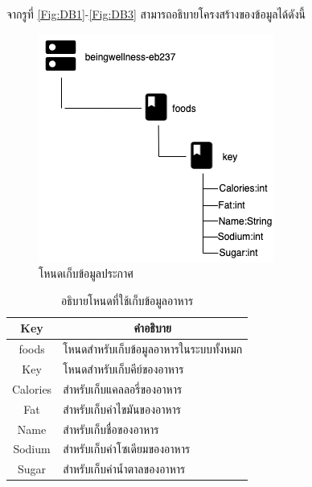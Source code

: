 \newpage
จากรูที่ \ref{Fig:DB1}-\ref{Fig:DB3} สามารถอธิบายโครงสร้างของข้อมูลได้ดังนี้
\begin{figure}[H]
\centering
\includegraphics[width=0.6\columnwidth]
{Figures/3/DB/nodefood.png}
\caption{โหนดเก็บข้อมูลประกาศ}
\label{Fig:DB4}
\end{figure}
\begin{table}[H]
	\centering
	\caption{อธิบายโหนดที่ใช้เก็บข้อมูลอาหาร}
	\label{my-label1}
	\begin{tabular}{|c|p{10cm}|}
		\hline
		\multicolumn{1}{|c|}{\textbf{Key}} & \multicolumn{1}{c|}{\textbf{คำอธิบาย}} \\ \hline
		foods & โหนดสำหรับเก็บข้อมูลอาหารในระบบทั้งหมก \\ \hline
		Key &  โหนดสำหรับเก็บคีย์ของอาหาร \\ \hline
		Calories & สำหรับเก็บแคลลอรี่ของอาหาร \\ \hline
		Fat & สำหรับเก็บค่าไขมันของอาหาร  \\ \hline
		Name &  สำหรับเก็บชื่อของอาหาร \\ \hline
		Sodium &  สำหรับเก็บค่าโซเดียมของอาหาร \\ \hline
		Sugar & สำหรับเก็บค่าน้ำตาลของอาหาร \\ \hline
		\end{tabular}
\end{table}


